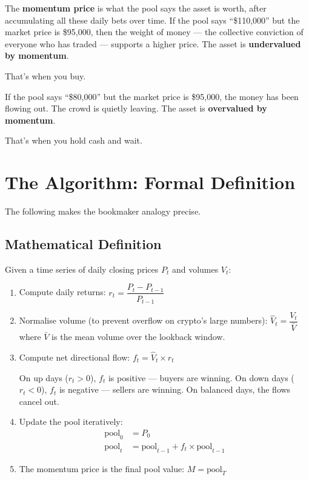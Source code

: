 \documentclass[11pt,a4paper]{article}
\begin{document}
The \textbf{momentum price} is what the pool says the asset is worth,
after accumulating all these daily bets over time. If the pool says
``\$110,000'' but the market price is \$95,000, then the weight of
money --- the collective conviction of everyone who has traded ---
supports a higher price. The asset is \textbf{undervalued by momentum}.

That's when you buy.

If the pool says ``\$80,000'' but the market price is \$95,000, the
money has been flowing out. The crowd is quietly leaving. The asset is
\textbf{overvalued by momentum}.

That's when you hold cash and wait.


\section{The Algorithm: Formal Definition}

The following makes the bookmaker analogy precise.

\subsection{Mathematical Definition}

Given a time series of daily closing prices $P_t$ and volumes $V_t$:

\begin{enumerate}[leftmargin=2em]
    \item Compute daily returns:
          $r_t = \dfrac{P_t - P_{t-1}}{P_{t-1}}$

    \item Normalise volume (to prevent overflow on crypto's large
          numbers):
          $\hat{V}_t = \dfrac{V_t}{\bar{V}}$
          where $\bar{V}$ is the mean volume over the lookback window.

    \item Compute net directional flow:
          $f_t = \hat{V}_t \times r_t$

          On up days ($r_t > 0$), $f_t$ is positive --- buyers are winning.
          On down days ($r_t < 0$), $f_t$ is negative --- sellers are winning.
          On balanced days, the flows cancel out.

    \item Update the pool iteratively:
          \begin{align*}
              \text{pool}_0 &= P_0 \\
              \text{pool}_t &= \text{pool}_{t-1} + f_t \times \text{pool}_{t-1}
          \end{align*}

    \item The momentum price is the final pool value:
          $M = \text{pool}_T$
\end{enumerate}
\end{document}
